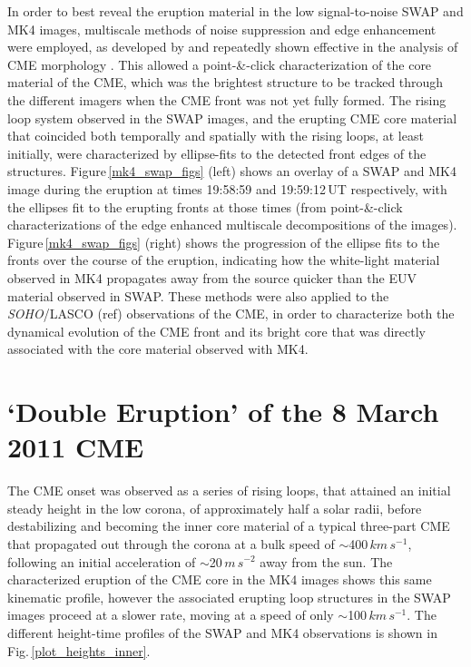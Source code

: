 \documentclass[preprint2]{aastex}
\begin{document}
In order to best reveal the eruption material in the low signal-to-noise SWAP and MK4 images, multiscale methods of noise suppression and edge enhancement were employed, as developed by \citet{2008SoPh..248..457Y} and repeatedly shown effective in the analysis of CME morphology \citep{2012ApJ...752..145B, 2009A&A...495..325B}. This allowed a point-\&-click characterization of the core material of the CME, which was the brightest structure to be tracked through the different imagers when the CME front was not yet fully formed. The rising loop system observed in the SWAP images, and the erupting CME core material that coincided both temporally and spatially with the rising loops, at least initially, were characterized by ellipse-fits to the detected front edges of the structures. Figure\,\ref{mk4_swap_figs} (left) shows an overlay of a SWAP and MK4 image during the eruption at times 19:58:59 and 19:59:12\,UT respectively, with the ellipses fit to the erupting fronts at those times (from point-\&-click characterizations of the edge enhanced multiscale decompositions of the images). Figure\,\ref{mk4_swap_figs} (right) shows the progression of the ellipse fits to the fronts over the course of the eruption, indicating how the white-light material observed in MK4 propagates away from the source quicker than the EUV material observed in SWAP. These methods were also applied to the \emph{SOHO}/LASCO (ref) observations of the CME, in order to characterize both the dynamical evolution of the CME front and its bright core that was directly associated with the core material observed with MK4.

\section{`Double Eruption' of the 8 March 2011 CME}

The CME onset was observed as a series of rising loops, that attained an initial steady height in the low corona, of approximately half a solar radii, before destabilizing and becoming the inner core material of a typical three-part CME that propagated out through the corona at a bulk speed of $\sim$400$\,km\,s^{-1}$, following an initial acceleration of $\sim$20$\,m\,s^{-2}$ away from the sun. The characterized eruption of the CME core in the MK4 images shows this same kinematic profile, however the associated erupting loop structures in the SWAP images proceed at a slower rate, moving at a speed of only $\sim$100$\,km\,s^{-1}$. The different height-time profiles of the SWAP and MK4 observations is shown in Fig.\,\ref{plot_heights_inner}.
\end{document}
